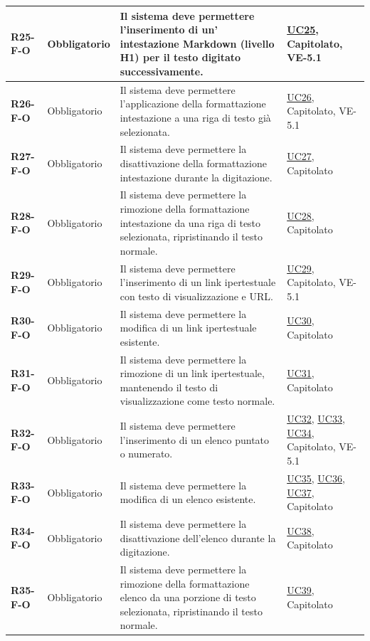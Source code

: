 \begin{longtable}{|p{2.5cm}|p{2.2cm}|p{6.8cm}|p{2.7cm}|}
	\textbf{R25-F-O} & Obbligatorio & Il sistema deve permettere l'inserimento di un' intestazione Markdown (livello H1) per il testo digitato successivamente. & \hyperlink{uc25}{UC25}, Capitolato, VE-5.1 \\ \hline
	\textbf{R26-F-O} & Obbligatorio & Il sistema deve permettere l'applicazione della formattazione intestazione a una riga di testo già selezionata. & \hyperlink{uc26}{UC26}, Capitolato, VE-5.1 \\ \hline
	\textbf{R27-F-O} & Obbligatorio & Il sistema deve permettere la disattivazione della formattazione intestazione durante la digitazione. & \hyperlink{uc27}{UC27}, Capitolato \\ \hline
	\textbf{R28-F-O} & Obbligatorio & Il sistema deve permettere la rimozione della formattazione intestazione da una riga di testo selezionata, ripristinando il testo normale. & \hyperlink{uc28}{UC28}, Capitolato \\ \hline
	\textbf{R29-F-O} & Obbligatorio & Il sistema deve permettere l'inserimento di un link ipertestuale con testo di visualizzazione e URL. & \hyperlink{uc29}{UC29}, Capitolato, VE-5.1 \\ \hline
	\textbf{R30-F-O} & Obbligatorio & Il sistema deve permettere la modifica di un link ipertestuale esistente. & \hyperlink{uc30}{UC30}, Capitolato \\ \hline
	\textbf{R31-F-O} & Obbligatorio & Il sistema deve permettere la rimozione di un link ipertestuale, mantenendo il testo di visualizzazione come testo normale. & \hyperlink{uc31}{UC31}, Capitolato \\ \hline
	\textbf{R32-F-O} & Obbligatorio & Il sistema deve permettere l'inserimento di un elenco puntato o numerato. & \hyperlink{uc32}{UC32}, \hyperlink{uc33}{UC33}, \hyperlink{uc34}{UC34}, Capitolato, VE-5.1 \\ \hline
	\textbf{R33-F-O} & Obbligatorio & Il sistema deve permettere la modifica di un elenco esistente. & \hyperlink{uc35}{UC35}, \hyperlink{uc36}{UC36}, \hyperlink{uc37}{UC37}, Capitolato \\ \hline
	\textbf{R34-F-O} & Obbligatorio & Il sistema deve permettere la disattivazione dell'elenco durante la digitazione. & \hyperlink{uc38}{UC38}, Capitolato \\ \hline
	\textbf{R35-F-O} & Obbligatorio & Il sistema deve permettere la rimozione della formattazione elenco da una porzione di testo selezionata, ripristinando il testo normale. & \hyperlink{uc39}{UC39}, Capitolato \\ \hline


\end{longtable}
